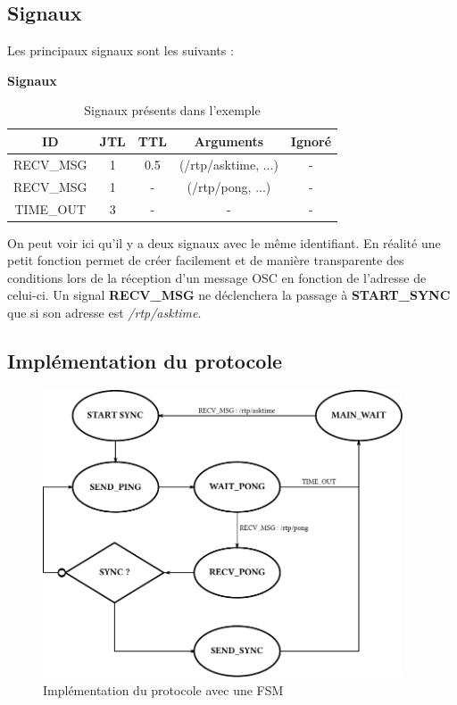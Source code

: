 \subsection{Signaux}
Les principaux signaux sont les suivants :~\\
\begin{table}[htbp]
\vspace{-5pt}
\centering

\textbf{Signaux}\vspace{8pt}~\\

\begin{tabularx}{0.95\textwidth}{|c|c|c|C|c|}
\hline
\textbf{ID} & \textbf{JTL} & \textbf{TTL} & \textbf{Arguments} & \textbf{Ignoré}  \tabularnewline
\hline
\hline
RECV\_MSG & 1 & 0.5 & (/rtp/asktime, ...) & - \tabularnewline
\hline
RECV\_MSG & 1 & - & (/rtp/pong, ...) & - \tabularnewline
\hline
TIME\_OUT & 3 & - & - & - \tabularnewline
\hline
\end{tabularx}
\vspace{10pt} 
\label{tab:sig_exemple}
\caption{Signaux présents dans l'exemple}
\end{table}

On peut voir ici qu'il y a deux signaux avec le même identifiant. En réalité une petit fonction permet de créer facilement et de manière transparente des conditions lors de la réception d'un message OSC en fonction de l'adresse de celui-ci. Un signal \textbf{RECV\_MSG} ne déclenchera la passage à \textbf{START\_SYNC} que si son adresse est \textit{/rtp/asktime}.

\subsection{Implémentation du protocole}
\begin{figure}[htbp]
  \centering
  \includegraphics[width=0.95\textwidth]{figs/exemple_fsm.pdf}
  \caption{Implémentation du protocole avec une FSM}
  \label{fig:fsm_sync}
  \vspace{-17pt}
\end{figure}~\\

